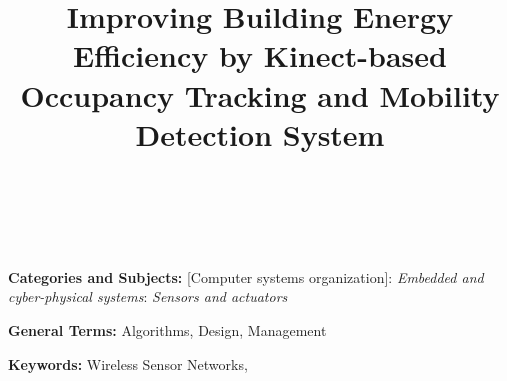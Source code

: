 \documentclass[preprint]{sig-alternate}
\begin{document}
\title{Improving Building Energy Efficiency by Kinect-based Occupancy
  Tracking and Mobility Detection System}

\author{\alignauthor  \ \\
 \\
}


\makeatletter
\let\@copyrightspace\relax
\makeatother

\pagestyle{plain}
\thispagestyle{plain}

\maketitle


\begin{abstract}

\end{abstract}


\noindent
{\bf Categories and Subjects:} {[Computer systems organization]}: {\em Embedded and cyber-physical systems}: {\em Sensors and actuators}

\noindent
{\bf General Terms: }Algorithms, Design, Management


\noindent
{\bf Keywords: }Wireless Sensor Networks,
\\








\end{document}
